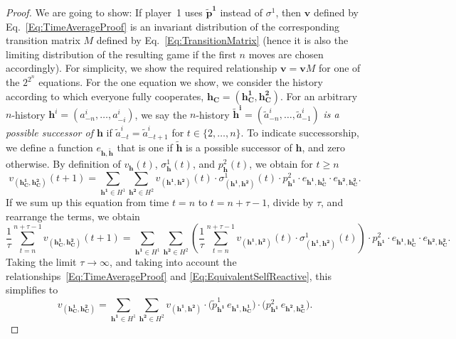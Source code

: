 \documentclass[11pt]{article}
\theoremstyle{plainCl1}
\theoremstyle{plainCl2}
\begin{document}
\begin{proof}
We are going to show: If player~1 uses $\mathbf{\tilde p^1}$ instead of $\sigma^1$, then $\mathbf{v}$ defined by Eq.~\eqref{Eq:TimeAverageProof} is an invariant distribution of the corresponding transition matrix $M$ defined by Eq.~\eqref{Eq:TransitionMatrix} (hence it is also the limiting distribution of the resulting game if the first $n$ moves are chosen accordingly). For simplicity, we show the required relationship $\mathbf{v}\!=\!\mathbf{v}M$ for one of the $2^{2^n}$ equations. For the one equation we show, we consider the history according to which everyone fully cooperates, $\mathbf{h_C}\!=\!(\mathbf{h^1_C},\mathbf{ h^2_C})$. For an arbitrary $n$-history $\mathbf{h}^i=(a^i_{-n},\ldots,a^i_{-i})$, we say the $n$-history $\mathbf{\tilde h^i}=(\tilde a^i_{-n},\ldots, \tilde a^i_{-1})$ {\it is a possible successor of $\mathbf{h}$} if $\tilde a^i_{-t} = \tilde a^i_{-t+1}$ for $t\!\in\!\{2,\ldots,n\}$. To indicate successorship, we define a function $e_{\mathbf{h},\mathbf{\tilde h}}$ that is one if $\mathbf{\tilde h}$ is a possible successor of $\mathbf{h}$, and zero otherwise. 
By definition of $v_\mathbf{h}(t)$, $\sigma_\mathbf{h}^1(t)$, and $p^2_\mathbf{h}(t)$, we obtain for $t\!\ge\!n$
\begin{equation}
v_{(\mathbf{h^1_C},\mathbf{h^2_C})} (t\!+\!1)
= \sum_{\mathbf{h^1}\in H^1}\sum_{\mathbf{h^2}\in H^2} v_{(\mathbf{h^1},\mathbf{h^2})}(t)\cdot  \sigma^1_{(\mathbf{h^1},\mathbf{h^2})}(t) \cdot p^2_\mathbf{h^1} \cdot e_{\mathbf{h^1},\mathbf{h^1_C}} \cdot e_{\mathbf{h^2},\mathbf{h^2_C}}.
\end{equation}
If we sum up this equation from time $t\!=\!n$ to $t\!=\!n\!+\!\tau\!-\!1$, divide by $\tau$, and rearrange the terms, we obtain
\begin{equation}
\frac{1}{\tau}\sum_{t=n}^{n+\tau-1} v_{(\mathbf{h^1_C},\mathbf{h^2_C})} (t\!+\!1) 
= \sum_{\mathbf{h^1}\in H^1} \sum_{\mathbf{h^2}\in H^2} \left(\frac{1}{\tau}\sum_{t=n}^{n+\tau-1} v_{(\mathbf{h^1},\mathbf{h^2})}(t)\cdot  \sigma^1_{(\mathbf{h^1},\mathbf{h^2})}(t)\right) \cdot p^2_\mathbf{h^1} \cdot e_{\mathbf{h^1},\mathbf{h^1_C}} \cdot e_{\mathbf{h^2},\mathbf{h^2_C}}.
\end{equation}
Taking the limit $\tau\to\infty$, and taking into account the relationships~\eqref{Eq:TimeAverageProof} and \eqref{Eq:EquivalentSelfReactive}, this simplifies to
\begin{equation} 
v_{(\mathbf{h^1_C},\mathbf{h^2_C})}
= \sum_{\mathbf{h^1}\in H^1}\sum_{\mathbf{h^2} \in H^2} v_{(\mathbf{h^1}, \mathbf{h^2})} \cdot \big(\tilde p^1_{\mathbf{h^1}} \, e_{\mathbf{h^1},\mathbf{h^1_C}}\big) \cdot \big(p^2_\mathbf{h^1} \, e_{\mathbf{h^2},\mathbf{h^2_C}}\big).

\end{equation}
\end{proof}
\end{document}
